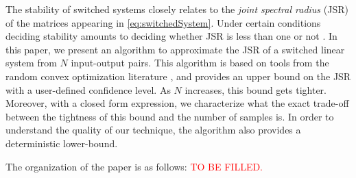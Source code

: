 The stability of switched systems closely relates to the \emph{joint spectral radius} (JSR) of the matrices appearing in \eqref{eq:switchedSystem}. Under certain conditions deciding stability amounts to deciding whether JSR is less than one or not \cite{jungersBook}. In this paper, we present an algorithm to approximate the JSR of a switched linear system from $N$ input-output pairs. This algorithm is based on tools from the random convex optimization literature \cite{campi}, and provides an upper bound on the JSR with a user-defined confidence level. As $N$ increases, this bound gets tighter. Moreover, with a closed form expression, we characterize what the exact trade-off between the tightness of this bound and the number of samples is. In order to understand the quality of our technique, the algorithm also provides a deterministic lower-bound.

The organization of the paper is as follows: \textcolor{red}{TO BE FILLED.}





